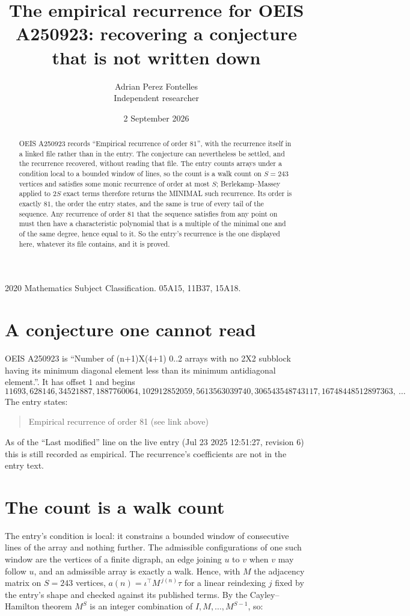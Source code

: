 \documentclass[11pt,a4paper]{article}
\title{The empirical recurrence for OEIS A250923: recovering a conjecture that is not written down}
\author{Adrian Perez Fontelles\\ \small Independent researcher}
\date{2 September 2026}
\theoremstyle{plain}
\theoremstyle{definition}
\begin{document}
\maketitle

\begin{abstract}
OEIS A250923 records ``Empirical recurrence of order $81$'', with the recurrence itself in a
linked file rather than in the entry. The conjecture can nevertheless be settled, and the
recurrence recovered, without reading that file. The entry counts arrays under a condition
local to a bounded window of lines, so the count is a walk count on $S=243$ vertices and
satisfies some monic recurrence of order at most $S$; Berlekamp--Massey applied to $2S$ exact
terms therefore returns the MINIMAL such recurrence. Its order is exactly $81$, the order
the entry states, and the same is true of every tail of the sequence. Any recurrence of order
$81$ that the sequence satisfies from any point on must then have a characteristic
polynomial that is a multiple of the minimal one and of the same degree, hence equal to it. So
the entry's recurrence is the one displayed here, whatever its file contains, and it is
proved.
\end{abstract}

\noindent\small 2020 Mathematics Subject Classification. 05A15, 11B37, 15A18.\normalsize

\section{A conjecture one cannot read}

OEIS A250923 is ``Number of (n+1)X(4+1) 0..2 arrays with no 2X2 subblock having its minimum diagonal element less than its minimum antidiagonal element.''. It has offset $1$ and begins
\[
11693, 628146, 34521887, 1887760064, 102912852059, 5613563039740, 306543548743117, 16748448512897363,\ \dots
\]
The entry states:
\begin{quote}
Empirical recurrence of order 81 (see link above)
\end{quote}
As of the ``Last modified'' line on the live entry (Jul 23 2025 12:51:27, revision 6) this is still
recorded as empirical. The recurrence's coefficients are not in the entry text.

\section{The count is a walk count}

The entry's condition is local: it constrains a bounded window of consecutive lines of the
array and nothing further. The admissible configurations of one such window are the vertices
of a finite digraph, an edge joining $u$ to $v$ when $v$ may follow $u$, and an admissible
array is exactly a walk. Hence, with $M$ the adjacency matrix on $S=243$ vertices,
$a(n)=\iota^{\!\top}M^{\,j(n)}\tau$ for a linear reindexing $j$ fixed by the entry's shape
and checked against its published terms. By the Cayley--Hamilton theorem $M^{S}$ is an
integer combination of $I,M,\dots,M^{S-1}$, so:
\end{document}
